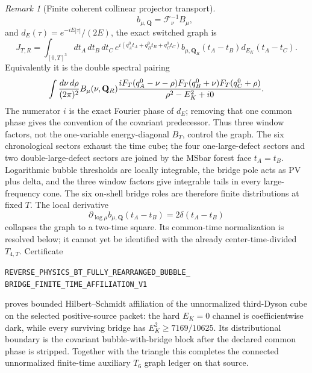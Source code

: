 \documentclass[11pt]{article}
\theoremstyle{definition}
\theoremstyle{remark}
\newtheorem{remark}[theorem]{Remark}
\begin{document}
\begin{remark}[Finite coherent collinear projector transport]
\[ \qquad
 b_{\mu,\mathbf Q}=\mathcal F_\nu^{-1}B_\mu,
\]
and \(d_E(\tau)=e^{-iE|\tau|}/(2E)\), the exact switched graph is
\[
 J_{T,R}=\int_{[0,T]^3}dt_A\,dt_B\,dt_C\,
 e^{i(q_A^0t_A+q_B^0t_B+q_C^0t_C)}
 b_{\mu,\mathbf Q_R}(t_A-t_B)d_{E_K}(t_A-t_C).
\]
Equivalently it is the double spectral pairing
\[
 \int{d\nu\,d\rho\over(2\pi)^2}B_\mu(\nu,\mathbf Q_R)
 {iF_T(q_A^0-\nu-\rho)F_T(q_B^0+\nu)F_T(q_C^0+\rho)
  \over \rho^2-E_K^2+i0}.
\]
The numerator \(i\) is the exact Fourier phase of \(d_E\); removing that one
common phase gives the convention of the covariant predecessor.
Thus three window factors, not the one-variable energy-diagonal \(B_T\),
control the graph.  The six chronological sectors exhaust the time cube; the
four one-large-defect sectors and two double-large-defect sectors are joined
by the MSbar forest face \(t_A=t_B\).  Logarithmic bubble thresholds are
locally integrable, the bridge pole acts as PV plus delta, and the three
window factors give integrable tails in every large-frequency cone.  The six
on-shell bridge roles are therefore finite distributions at fixed \(T\).
The local derivative
\[
 \partial_{\log\mu}b_{\mu,\mathbf Q}(t_A-t_B)
 =2\delta(t_A-t_B)
\]
collapses the graph to a two-time square.  Its common-time normalization is
resolved below; it cannot yet be identified with the already
center-time-divided \(T_{4,T}\).  Certificate
\par\noindent
\texttt{REVERSE\_PHYSICS\_BT\_FULLY\_REARRANGED\_BUBBLE\_}
\allowbreak\texttt{BRIDGE\_FINITE\_TIME\_AFFILIATION\_V1}
\par\noindent
proves bounded Hilbert--Schmidt affiliation of the unnormalized third-Dyson
cube on the selected positive-source
packet: the hard \(E_K=0\) channel is coefficientwise dark, while every
surviving bridge has \(E_K^2\ge7169/10625\).  Its distributional boundary is
the covariant bubble-with-bridge block after the declared common phase is
stripped.  Together with the triangle this
completes the connected unnormalized finite-time auxiliary \(T_6\) graph
ledger on that source.


\end{remark}
\end{document}
